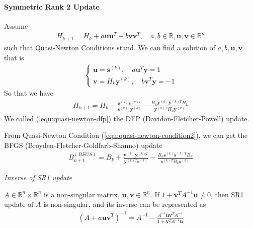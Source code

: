 \paragraph{Symmetric Rank 2 Update}
Assume
\begin{align}
    H_{k+1} = H_k + a \mathbf{u}\mathbf{u}^T +
     b \mathbf{v}\mathbf{v}^T,
     \quad a, b \in \mathbb{R}, \mathbf{u}, \mathbf{v} \in \mathbb{R}^n
\end{align}
such that Quasi-Newton Conditions stand.
We can find a solution of $a, b, \mathbf{u}, \mathbf{v}$ that is
\begin{align}
    \left\{
    \begin{array}{ll}
        \mathbf{u} = \mathbf{s}^{(k)}, 
        \quad a \mathbf{u}^T \mathbf{y} = 1 \\
        \mathbf{v} = H_k \mathbf{y}^{(k)}, 
        \quad b \mathbf{v}^T \mathbf{y} = -1
    \end{array}
    \right.
\end{align}
So that we have
\begin{align}
    H_{k+1} = H_k + \frac{\mathbf{s}^{(k)}\mathbf{s}^{(k)T}}
    {\mathbf{s}^{(k)T} \mathbf{y}^{(k)}} - 
    \frac{H_k\mathbf{y}^{(k)} \mathbf{y}^{(k)T} H_k}
    {\mathbf{y}^{(k)T}H_k\mathbf{y}^{(k)}}
    \label{equ:quasi-newton-dfp}
\end{align}
We called (\ref{equ:quasi-newton-dfp}) the DFP (Davidon-Fletcher-Powell) update.
\par
From Quasi-Newton Condition (\ref{equ:quasi-newton-condition2}), we can get the
BFGS (Broyden-Fletcher-Goldfarb-Shanno) update
\begin{align}
    B_{k+1}^{(BFGS)} = B_k +
    \frac{\mathbf{y}^{(k)}\mathbf{y}^{(k)T}}
    {\mathbf{y}^{(k)T} \mathbf{s}^{(k)}}
    - \frac{B_k \mathbf{s}^{(k)}\mathbf{s}^{(k)T} B_k}
    {\mathbf{s}^{(k)T} B_k \mathbf{s}^{(k)}}
\end{align}
\vspace{.3em}
\par\noindent\textit{Inverse of SR1 update}
\begin{theorem}
    $A \in \mathbb{R}^n \times \mathbb{R}^n$ is a 
    non-singular matrix, $\mathbf{u}, \mathbf{v} \in \mathbb{R}^n$.
    If $1 + \mathbf{v}^TA^{-1}\mathbf{u} \neq 0$,
    then SR1 update of $A$ is non-singular, and its inverse
    can be represented as
    \begin{align}
        (A + a\mathbf{u}\mathbf{v}^T)^{-1} = 
        A^{-1} - \frac{A^{-1}\mathbf{u}\mathbf{v}^TA^{-1}}
        {1 + \mathbf{v}^TA^{-1}\mathbf{u}}
    \end{align}
\end{theorem}

